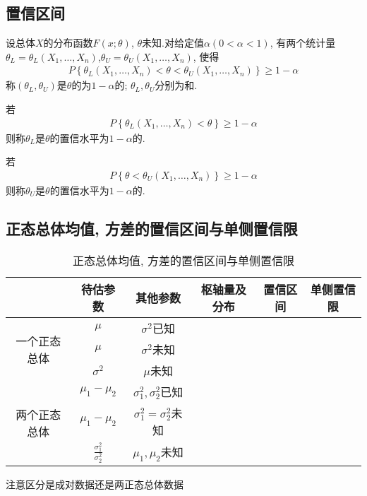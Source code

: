 \subsection{置信区间}
\begin{definition}
    设总体$X$的分布函数$F(x;\theta)$, $\theta$未知.对给定值$\alpha(0<\alpha<1)$, 有两个统计量 $\theta_L=\theta_L(X_1,\dots,X_n)$,$\theta_U=\theta_U(X_1,\dots,X_n)$, 使得
    \begin{align*}
        P\left\{ \theta_L(X_1,\dots,X_n)<\theta<\theta_U(X_1,\dots,X_n) \right\}\ge 1-\alpha
    \end{align*}
    称$\left(\theta_L,\theta_U\right)$是$\theta$的为$1-\alpha$的; $\theta_L,\theta_U$分别为和. 

    若
    \begin{align*}
        P\left\{ \theta_L(X_1,\dots,X_n)<\theta \right\}\ge 1-\alpha
    \end{align*}
    则称$\theta_L$是$\theta$的置信水平为$1-\alpha$的. 

    若
    \begin{align*}
        P\left\{ \theta<\theta_U(X_1,\dots,X_n) \right\}\ge 1-\alpha
    \end{align*}
    则称$\theta_U$是$\theta$的置信水平为$1-\alpha$的. 
\end{definition}


\subsection{正态总体均值, 方差的置信区间与单侧置信限}

\begin{table*}[htb]
    \centering
    \begin{tabular}[c]{|cccccc|}\hline
        \multicolumn{1}{|c|}{ } & 待估参数 & 其他参数 & 枢轴量及分布 & 置信区间 & 单侧置信限 \\ \hline
        \multicolumn{1}{|c|}{\multirow{3}{2em}{一个正态总体}} & $\mu$ & $\sigma^2$已知 & & & \\
        \multicolumn{1}{|c|}{ }& $\mu$ & $\sigma^2$未知 & & & \\
        \multicolumn{1}{|c|}{ }& $\sigma^2$ & $\mu$未知 & & & \\ \hline
        \multicolumn{1}{|c|}{\multirow{3}{2em}{两个正态总体}} & $\mu_1-\mu_2$ & $\sigma_1^2,\sigma_2^2$已知 & & & \\
        \multicolumn{1}{|c|}{ }& $\mu_1-\mu_2$ & $\sigma_1^2=\sigma_2^2$未知 & & & \\
        \multicolumn{1}{|c|}{ }& $\frac{\sigma_1^2}{\sigma_2^2}$ & $\mu_1,\mu_2$未知 & & & \\ \hline
    \end{tabular}
    \caption{正态总体均值, 方差的置信区间与单侧置信限}
\end{table*}

注意区分是成对数据还是两正态总体数据